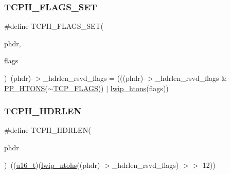 \mbox{\label{openmote-cc2538_2lwip_2src_2include_2lwip_2prot_2tcp_8h_afe7c917080459557c65071c4b13c8e12}} 
\subsubsection{\texorpdfstring{T\+C\+P\+H\+\_\+\+F\+L\+A\+G\+S\+\_\+\+S\+ET}{TCPH\_FLAGS\_SET}}
{\footnotesize\ttfamily \#define T\+C\+P\+H\+\_\+\+F\+L\+A\+G\+S\+\_\+\+S\+ET(\begin{DoxyParamCaption}\item[{}]{phdr,  }\item[{}]{flags }\end{DoxyParamCaption})~(phdr)-\/$>$\+\_\+hdrlen\+\_\+rsvd\+\_\+flags = (((phdr)-\/$>$\+\_\+hdrlen\+\_\+rsvd\+\_\+flags \& \hyperlink{openmote-cc2538_2lwip_2src_2include_2lwip_2def_8h_a0dfd02d7c09f9c698a5a7ecc0b7287ad}{P\+P\+\_\+\+H\+T\+O\+NS}($\sim$\hyperlink{openmote-cc2538_2lwip_2src_2include_2lwip_2prot_2tcp_8h_a75dbc3ac2d65c23a60dbe2f96a874501}{T\+C\+P\+\_\+\+F\+L\+A\+GS})) $\vert$ \hyperlink{openmote-cc2538_2lwip_2src_2core_2def_8c_ad637280639de4066392e6b5614fa3e56}{lwip\+\_\+htons}(flags))}

\mbox{\label{openmote-cc2538_2lwip_2src_2include_2lwip_2prot_2tcp_8h_a5b97d3b7e68c20eb3eab87a61d779223}} 
\subsubsection{\texorpdfstring{T\+C\+P\+H\+\_\+\+H\+D\+R\+L\+EN}{TCPH\_HDRLEN}}
{\footnotesize\ttfamily \#define T\+C\+P\+H\+\_\+\+H\+D\+R\+L\+EN(\begin{DoxyParamCaption}\item[{}]{phdr }\end{DoxyParamCaption})~((\hyperlink{group__compiler__abstraction_ga77570ac4fcab86864fa1916e55676da2}{u16\+\_\+t})(\hyperlink{openmote-cc2538_2lwip_2src_2include_2lwip_2def_8h_ac642bf6057869696d7807564d8309ffc}{lwip\+\_\+ntohs}((phdr)-\/$>$\+\_\+hdrlen\+\_\+rsvd\+\_\+flags) $>$$>$ 12))}


